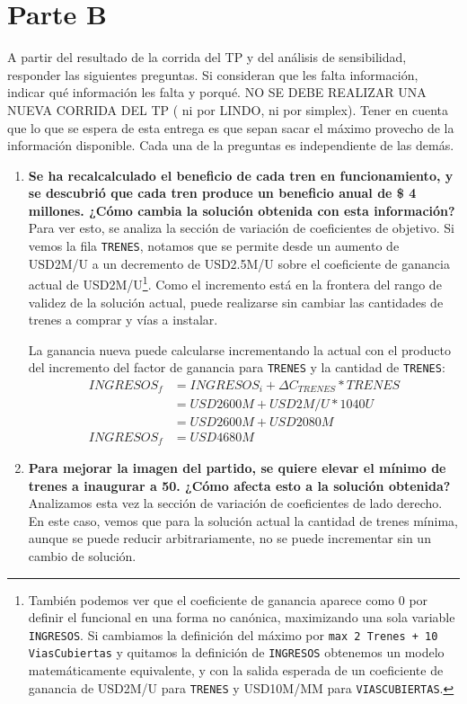 \documentclass[10pt, a4paper, titlepage,
	oneside,
	fleqn, leqno]{article}
\let\oldsection\section
\def\section{\cleardoublepage\oldsection}
\begin{document}
\section{Parte B}
A partir del resultado de la corrida del TP y del análisis de sensibilidad, responder las siguientes preguntas. Si consideran que les falta información, indicar qué información les falta y porqué. NO SE DEBE REALIZAR UNA NUEVA CORRIDA DEL TP ( ni por LINDO, ni por simplex). Tener en cuenta que lo que se espera de esta entrega es que sepan sacar el máximo provecho de la información disponible. Cada una de la preguntas es independiente de las demás.
\begin{enumerate} [a .]
\item \textbf{Se ha recalcalculado el beneficio de cada tren en funcionamiento, y se descubrió que cada tren produce un beneficio anual de \$ 4 millones. ¿Cómo cambia la solución obtenida con esta información?}\\
	Para ver esto, se analiza la sección de variación de coeficientes de objetivo.
Si vemos la fila \texttt{TRENES}, notamos que se permite desde un aumento de USD2M/U a un decremento de USD2.5M/U sobre el coeficiente de ganancia actual de USD2M/U\footnote{
	También podemos ver que el coeficiente de ganancia aparece como 0 por definir el funcional en una forma no canónica, maximizando una sola variable \texttt{INGRESOS}.
	Si cambiamos la definición del máximo por \texttt{max 2 Trenes + 10 ViasCubiertas} y quitamos la definición de \texttt{INGRESOS} obtenemos un modelo matemáticamente equivalente, y con la salida esperada de un coeficiente de ganancia de USD2M/U para \texttt{TRENES} y USD10M/MM para \texttt{VIASCUBIERTAS}.}.
Como el incremento está en la frontera del rango de validez de la solución actual, puede realizarse sin cambiar las cantidades de trenes a comprar y vías a instalar.

	La ganancia nueva puede calcularse incrementando la actual con el producto del incremento del factor de ganancia para \texttt{TRENES} y la cantidad de \texttt{TRENES}:
\begin{align*}
	INGRESOS_f &= INGRESOS_i + \Delta C_{TRENES} * TRENES\\
		&= USD2600M + USD2M/U * 1040U\\
		&= USD2600M + USD2080M\\
	INGRESOS_f &= USD4680M
\end{align*}

\item \textbf{Para mejorar la imagen del partido, se quiere elevar el mínimo de trenes a inaugurar a 50. ¿Cómo afecta esto a la solución obtenida?}\\
	Analizamos esta vez la sección de variación de coeficientes de lado derecho.
En este caso, vemos que para la solución actual la cantidad de trenes mínima, aunque se puede reducir arbitrariamente, no se puede incrementar sin un cambio de solución.


\end{enumerate}
\end{document}
